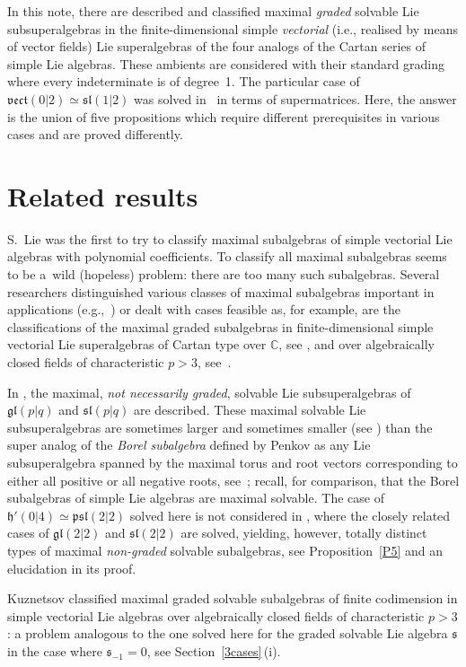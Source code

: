 \documentclass[pdftex]{sigma}
\newcommand {\Cee} {{\mathbb C}}
\newcommand {\fgl} {{\mathfrak{gl}}} %
\newcommand {\fh} {{\mathfrak{h}}}
\newcommand {\fpsl} {{\mathfrak{psl}}}
\newcommand {\fs} {{\mathfrak{s}}}
\newcommand {\fsl} {{\mathfrak{sl}}}
\newcommand {\fvect} {{\mathfrak{vect}}} %
\newcommand {\<} [2] {{\left.\vphantom{#2}\right.^{#1\!}\!{#2}}}
\numberwithin{equation}{section}
\begin{document}
In this note, there are described and classified maximal \textit{graded} solvable Lie subsuperalgebras in the finite-dimensional simple \textit{vectorial} (i.e., realised by means of vector fields) Lie superalgebras of the four analogs of the Cartan series of simple Lie algebras. These ambients are considered with their standard grading where every indeterminate is of degree~1. The particular case of $\fvect(0|2)\simeq \fsl(1|2)$ was solved in~\cite{S2} in terms of supermatrices. Here, the answer is the union of five propositions which require different prerequisites in various cases and are proved differently.

\section{Related results}
S.~Lie was the first to try to classify maximal subalgebras of simple vectorial Lie algebras
with polynomial coefficients. To classify all maximal subalgebras seems
to be a~wild (hopeless) problem: there are too many such subalgebras. Several researchers distinguished various classes of maximal subalgebras important in applications (e.g.,~\cite{Og,So}) or dealt with cases feasible as, for example, are the classifications of the maximal graded subalgebras in finite-dimensional simple vectorial Lie superalgebras of Cartan type over $\Cee$, see \cite{BLM}, and over algebraically closed fields of characteristic $p>3$, see~\cite{BLLM}.

In \cite{S2}, the maximal, \textit{not necessarily graded}, solvable Lie subsuperalgebras of $\fgl(p|q)$ and $\fsl(p|q)$ are described. These maximal solvable Lie subsuperalgebras are sometimes larger and sometimes smaller (see \cite[Theorem~3]{S2}) than the super analog of the \textit{Borel subalgebra} defined by Penkov as any Lie subsuperalgebra spanned by the maximal torus and root vectors corresponding to either all positive or all negative roots, see~\cite{P}; recall, for comparison, that the Borel subalgebras of simple Lie algebras are maximal solvable. The case of $\fh'(0|4)\simeq \fpsl(2|2)$ solved here is not considered in \cite{S2}, where the closely related cases of $\fgl(2|2)$ and $\fsl(2|2)$ are solved, yielding, however, totally distinct types of maximal \textit{non-graded} solvable subalgebras, see Proposition~\ref{P5} and an elucidation in its proof.

Kuznetsov \cite{Ku} classified maximal graded solvable subalgebras of finite codimension in simple vectorial Lie algebras over algebraically closed fields of characteristic $p>3$: a problem analogous to the one solved here for the graded solvable Lie algebra $\fs$ in the case where $\fs_{-1}=0$, see Section~\ref{3cases}\,(i).
\end{document}
